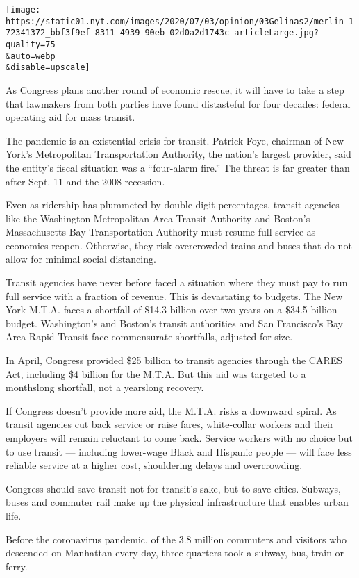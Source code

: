 \texttt{[image: https://static01.nyt.com/images/2020/07/03/opinion/03Gelinas2/merlin\_172341372\_bbf3f9ef-8311-4939-90eb-02d0a2d1743c-articleLarge.jpg?quality=75\\\&auto=webp\\\&disable=upscale]}

As Congress plans another round of economic rescue, it will have to take
a step that lawmakers from both parties have found distasteful for four
decades: federal operating aid for mass transit.

The pandemic is an existential crisis for transit. Patrick Foye,
chairman of New York's Metropolitan Transportation Authority, the
nation's largest provider, said the entity's fiscal situation was a
``four-alarm fire.'' The threat is far greater than after Sept. 11 and
the 2008 recession.

Even as ridership has plummeted by double-digit percentages, transit
agencies like the Washington Metropolitan Area Transit Authority and
Boston's Massachusetts Bay Transportation Authority must resume full
service as economies reopen. Otherwise, they risk overcrowded trains and
buses that do not allow for minimal social distancing.

Transit agencies have never before faced a situation where they must pay
to run full service with a fraction of revenue. This is devastating to
budgets. The New York M.T.A. faces a shortfall of \$14.3 billion over
two years on a \$34.5 billion budget. Washington's and Boston's transit
authorities and San Francisco's Bay Area Rapid Transit face commensurate
shortfalls, adjusted for size.

In April, Congress provided \$25 billion to transit agencies through the
CARES Act, including \$4 billion for the M.T.A. But this aid was
targeted to a monthslong shortfall, not a yearslong recovery.

If Congress doesn't provide more aid, the M.T.A. risks a downward
spiral. As transit agencies cut back service or raise fares,
white-collar workers and their employers will remain reluctant to come
back. Service workers with no choice but to use transit --- including
lower-wage Black and Hispanic people --- will face less reliable service
at a higher cost, shouldering delays and overcrowding.

Congress should save transit not for transit's sake, but to save cities.
Subways, buses and commuter rail make up the physical infrastructure
that enables urban life.

Before the coronavirus pandemic, of the 3.8 million commuters and
visitors who descended on Manhattan every day, three-quarters took a
subway, bus, train or ferry.

